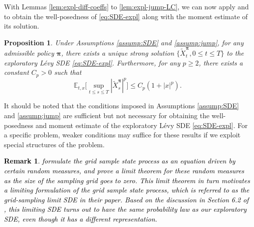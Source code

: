 \documentclass[11pt]{article}
\newtheorem{proposition}{Proposition}
\newtheorem{remark}{Remark}
\newcommand{\1}{\mathbbm{1}}
\newcommand{\bpi}{\boldsymbol{\pi}}
\newcommand{\gao}[1]{\textcolor{black}{{#1}}}
\begin{document}
With Lemmas \ref{lem:expl-diff-coeffs} to \ref{lem:expl-jump-LC}, we can now apply \cite[Theorem 3.2]{kunita2004stochastic} and \cite[Theorem 119]{rong2006theory} to obtain the well-posedness of \eqref{eq:SDE-expl} along with the moment estimate of its solution.
\begin{proposition}\label{prop:expl-SDE-wellposed}
	Under Assumptions \ref{assump:SDE} and \ref{assump:jump}, for any admissible policy $\bpi$, there exists a unique strong solution $\{\tilde{X}_t^{\bpi}, 0\leq t\leq T\}$ to the exploratory L\'evy SDE \eqref{eq:SDE-expl}. Furthermore, for any $p\geq 2$, there exists a constant $C_p>0$ such that
	\begin{equation}\label{eq:moment-expl}
		\mathbb{E}_{t,x}\Big[\sup_{t\le s\le T} |\tilde{X}_s^{\bpi}|^{p}\Big]\le C_p(1+|x|^{p}).
	\end{equation}
\end{proposition}

It should be noted that the conditions imposed in Assumptions \ref{assump:SDE} and \ref{assump:jump} are sufficient but not necessary for obtaining the well-posedness and moment estimate of the exploratory L\'evy SDE \eqref{eq:SDE-expl}. For a specific problem, weaker conditions may suffice for these results if we exploit special structures of the problem.



\gao{
\begin{remark}
   \cite{bender2024continuous} formulate the grid sample state process as an equation driven by certain random measures, and prove a limit theorem  for these random measures as the size of the sampling grid goes to zero.
 This limit theorem in turn motivates a limiting formulation of the grid sample state process, which is referred to as the grid-sampling limit SDE in their paper. Based on the discussion in Section 6.2 of \cite{bender2024continuous}, this limiting SDE turns out to have the same probability law as our exploratory SDE, even though it has a different representation.
\end{remark}
}
\end{document}
